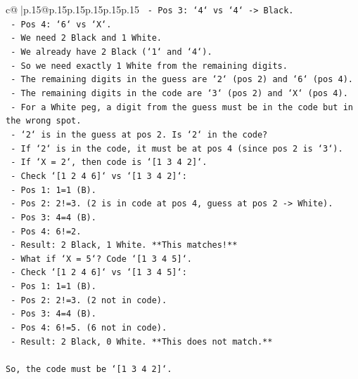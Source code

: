 \documentclass{article}
\begin{document}
{\begin{supertabular}{c@{$\;$}|p{.15\linewidth}@{}p{.15\linewidth}p{.15\linewidth}p{.15\linewidth}p{.15\linewidth}p{.15\linewidth}}
{{{\texttt{    {-} Pos 3: `4` vs `4` {-}> Black.} \\
\texttt{    {-} Pos 4: `6` vs `X`.} \\
\texttt{    {-} We need 2 Black and 1 White.} \\
\texttt{    {-} We already have 2 Black (`1` and `4`).} \\
\texttt{    {-} So we need exactly 1 White from the remaining digits.} \\
\texttt{    {-} The remaining digits in the guess are `2` (pos 2) and `6` (pos 4).} \\
\texttt{    {-} The remaining digits in the code are `3` (pos 2) and `X` (pos 4).} \\
\texttt{    {-} For a White peg, a digit from the guess must be in the code but in the wrong spot.} \\
\texttt{    {-} `2` is in the guess at pos 2. Is `2` in the code?} \\
\texttt{        {-} If `2` is in the code, it must be at pos 4 (since pos 2 is `3`).} \\
\texttt{        {-} If `X = 2`, then code is `{[}1 3 4 2{]}`.} \\
\texttt{        {-} Check `{[}1 2 4 6{]}` vs `{[}1 3 4 2{]}`:} \\
\texttt{            {-} Pos 1: 1=1 (B).} \\
\texttt{            {-} Pos 2: 2!=3. (2 is in code at pos 4, guess at pos 2 {-}> White).} \\
\texttt{            {-} Pos 3: 4=4 (B).} \\
\texttt{            {-} Pos 4: 6!=2.} \\
\texttt{            {-} Result: 2 Black, 1 White. **This matches!**} \\
\texttt{    {-} What if `X = 5`? Code `{[}1 3 4 5{]}`.} \\
\texttt{        {-} Check `{[}1 2 4 6{]}` vs `{[}1 3 4 5{]}`:} \\
\texttt{            {-} Pos 1: 1=1 (B).} \\
\texttt{            {-} Pos 2: 2!=3. (2 not in code).} \\
\texttt{            {-} Pos 3: 4=4 (B).} \\
\texttt{            {-} Pos 4: 6!=5. (6 not in code).} \\
\texttt{            {-} Result: 2 Black, 0 White. **This does not match.**} \\
\\ 
\texttt{So, the code must be `{[}1 3 4 2{]}`.} \\
}}}
\end{supertabular}}
\end{document}
